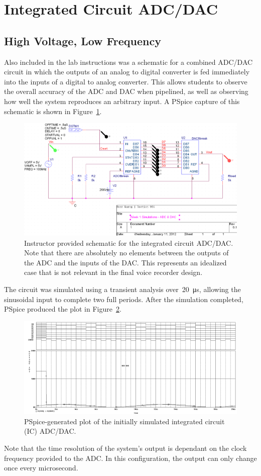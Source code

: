\section{Integrated Circuit ADC/DAC}
\subsection{High Voltage, Low Frequency}
Also included in the lab instructions was a schematic for a combined ADC/DAC
circuit in which the outputs of an analog to digital converter is fed
immediately into the inputs of a digital to analog converter.  This allows
students to observe the overall accuracy of the ADC and DAC when pipelined, as
well as observing how well the system reproduces an arbitrary input.  A PSpice
capture of this schematic is shown in Figure~\ref{f:combined_schem}.
%
\begin{figure}[H]
\centering
	\includegraphics[width=.8\textwidth]{img/shot/part3_schem_cropped.PNG}
	\parbox{.8\textwidth}{
	\caption[Integrated Circuit --- Schematic]{Instructor provided schematic
	for the integrated circuit ADC/DAC.  Note that there are absolutely no
	elements between the outputs of the ADC and the inputs of the DAC.  This
	represents an idealized case that is not relevant in the final voice
	recorder design.}
	\label{f:combined_schem}}
\end{figure}
%
The circuit was simulated using a transient analysis
over~\SI{20}{\micro\second}, allowing the sinusoidal input to complete two full
periods.  After the simulation completed, PSpice produced the plot in
Figure~\ref{f:combined_plot1}.
%
\begin{figure}[H]
\centering
	\includegraphics[width=.8\textwidth]{img/plot/part3_plot1.PNG}
	\parbox{.8\textwidth}{
	\caption[Integrated Circuit --- Initial Results]{PSpice-generated plot of
	the initially simulated integrated circuit (IC) ADC/DAC.}
	\label{f:combined_plot1}}
\end{figure}
%
Note that the time resolution of the system's output is dependant on the clock
frequency provided to the ADC.  In this configuration, the output can only
change once every microsecond.

